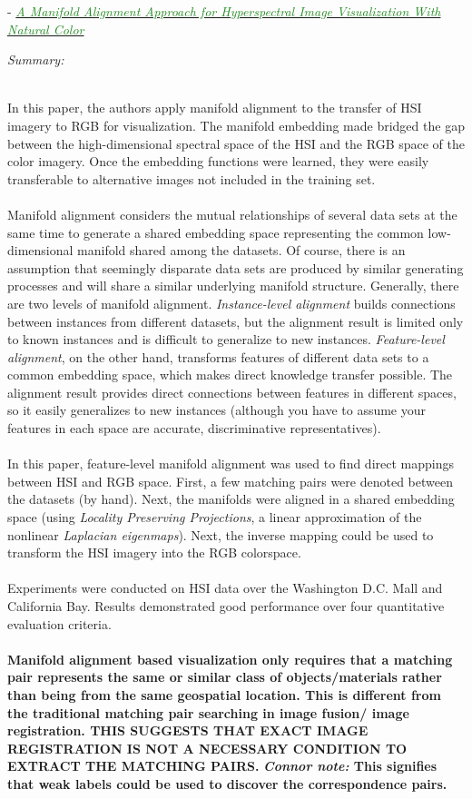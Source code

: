 \documentclass[]{article}
\newcommand{\paperentry}[4]{
            \hangindent=1cm
            \cite{#1} - \href{run:../References/#3}{\textcolor{ForestGreen}{\textit{#2}}}
            
            \noindent            
            \begin{minipage}[t]{0.1\linewidth}\hfill\end{minipage}
            \begin{minipage}[t]{0.8\linewidth}\textcolor{NavyBlue}{{\textit{Summary:}}}#4\end{minipage}
            \vspace{.25cm}
          }
\begin{document}
				
		\paperentry{Liao2016ManAlignmentHSI}
		{A Manifold Alignment Approach for Hyperspectral Image Visualization With Natural Color}
		{Manifold_Representation_Learning/Alignment/Liao2016ManAlignmentHSI.pdf}
		{}\\
		In this paper, the authors apply manifold alignment to the transfer of HSI imagery to RGB for visualization.  The manifold embedding made bridged the gap between the high-dimensional spectral space of the HSI and the RGB space of the color imagery.  Once the embedding functions were learned, they were easily transferable to alternative images not included in the training set. 
		\\ \\
		Manifold alignment considers the mutual relationships of several data sets at the same time to generate a shared embedding space representing the common low-dimensional manifold shared among the datasets.  Of course, there is an assumption that seemingly disparate data sets are produced by similar generating processes and will share a similar underlying manifold structure.  Generally, there are two levels of manifold alignment.  \textit{Instance-level alignment} builds connections between instances from different datasets, but the alignment result is limited only to known instances and is difficult to generalize to new instances.  \textit{Feature-level alignment}, on the other hand, transforms features of different data sets to a common embedding space, which makes direct knowledge transfer possible.  The alignment result provides direct connections between features in different spaces, so it easily generalizes to new instances (although you have to assume your features in each space are accurate, discriminative representatives).
		\\ \\
		In this paper, feature-level manifold alignment was used to find direct mappings between HSI and RGB space.  First, a few matching pairs were denoted between the datasets (by hand).  Next, the manifolds were aligned in a shared embedding space (using \textit{Locality Preserving Projections}, a linear approximation of the nonlinear \textit{Laplacian eigenmaps}). Next, the inverse mapping could be used to transform the HSI imagery into the RGB colorspace. 
		\\ \\
		Experiments were conducted on HSI data over the Washington D.C. Mall and California Bay.  Results demonstrated good performance over four quantitative evaluation criteria.
		\\ \\
		\textbf{Manifold alignment based visualization only requires that a matching pair represents the same or similar class of objects/materials rather than being from the same geospatial location.  This is different from the traditional matching pair searching in image fusion/ image registration.  THIS SUGGESTS THAT EXACT IMAGE REGISTRATION IS NOT A NECESSARY CONDITION TO EXTRACT THE MATCHING PAIRS.}  \textbf{\textit{Connor note:} This signifies that weak labels could be used to discover the correspondence pairs.} \\
		
\end{document}
